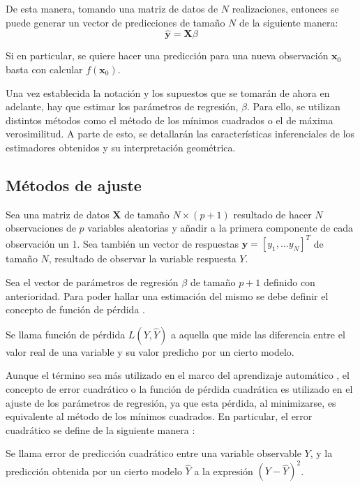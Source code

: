 \noindent De esta manera, tomando una matriz de datos de $N$ realizaciones, entonces se puede generar un vector de predicciones de tamaño $N$ de la siguiente manera:
\begin{equation}
\mathbf{\hat{y}}=\mathbf{X}\beta 
\end{equation}  

\noindent Si en particular, se quiere hacer una predicción para una nueva observación  $\mathbf{x}_0$ basta con calcular  $f(\textbf{x}_0).$

\noindent Una vez establecida la notación y los supuestos que se tomarán de ahora en adelante, hay que estimar los parámetros de regresión, $\beta$.  Para ello, se utilizan  distintos métodos como el método de los mínimos cuadrados o el de máxima verosimilitud. A parte de esto, se detallarán las características inferenciales de los estimadores obtenidos y su interpretación geométrica. 

\subsection{Métodos de ajuste}

\noindent Sea una matriz de datos $\textbf{X}$ de tamaño $N\times (p+1)$ resultado de hacer $N$ observaciones de $p$ variables aleatorias y añadir a la primera componente de cada observación un 1. Sea también un vector de respuestas $\textbf{y}=[y_1,\ldots y_N]^T$ de tamaño $N$, resultado de observar la variable respuesta $Y$. 

\noindent Sea el vector de parámetros de regresión $\beta$ de tamaño $p+1$ definido con anterioridad. Para poder hallar una estimación del mismo se debe definir el concepto de función de pérdida \cite{Hastie 2001}. 

\begin{defi}
Se llama función de pérdida $L(Y, \hat{Y})$ a aquella que mide las diferencia  entre el valor real de una variable y su valor predicho por un cierto modelo.  
\end{defi}

\noindent Aunque el término sea más utilizado en el marco del aprendizaje automático \cite{James 2013}, el concepto de error cuadrático o la función de pérdida cuadrática es utilizado en el ajuste de los parámetros de regresión, ya que esta pérdida, al minimizarse, es equivalente al método de los mínimos cuadrados. En particular, el error cuadrático se define de la siguiente manera \cite{Abdi 2007}:

\begin{defi}
Se llama error de predicción cuadrático entre una variable observable $Y$, y la predicción obtenida por un cierto modelo $\hat{Y}$ a la expresión $(Y-\hat{Y})^2$.
\end{defi}

